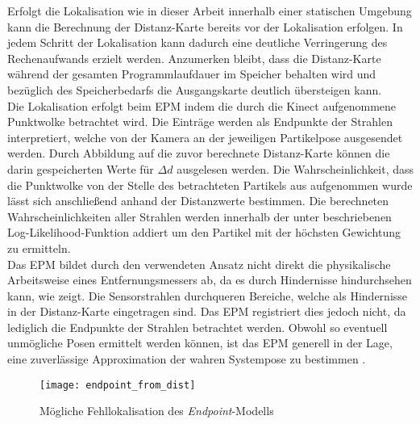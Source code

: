 Erfolgt die Lokalisation wie in dieser Arbeit innerhalb einer statischen Umgebung kann die Berechnung der Distanz-Karte bereits vor der Lokalisation erfolgen. In jedem Schritt der Lokalisation kann dadurch eine deutliche Verringerung des Rechenaufwands erzielt werden. Anzumerken bleibt, dass die Distanz-Karte während der gesamten Programmlaufdauer im Speicher behalten wird und bezüglich des Speicherbedarfs die Ausgangskarte deutlich übersteigen kann.\\

Die Lokalisation erfolgt beim EPM indem die durch die Kinect aufgenommene Punktwolke betrachtet wird. Die Einträge werden als Endpunkte der Strahlen interpretiert, welche von der Kamera an der jeweiligen Partikelpose ausgesendet werden. Durch Abbildung auf die zuvor berechnete Distanz-Karte können die darin gespeicherten Werte für $\Delta d$ ausgelesen werden. Die Wahrscheinlichkeit, dass die Punktwolke von der Stelle des betrachteten Partikels aus aufgenommen wurde lässt sich anschließend anhand der Distanzwerte bestimmen. Die berechneten Wahrscheinlichkeiten aller Strahlen werden innerhalb der unter  beschriebenen Log-Likelihood-Funktion addiert um den Partikel mit der höchsten Gewichtung zu ermitteln.\\

Das EPM bildet durch den verwendeten Ansatz nicht direkt die physikalische Arbeitsweise eines Entfernungsmessers ab, da es durch Hindernisse \glqq hindurchsehen\grqq{} kann, wie  zeigt. Die Sensorstrahlen durchqueren Bereiche, welche als Hindernisse in der Distanz-Karte eingetragen sind. Das EPM registriert dies jedoch nicht, da lediglich die Endpunkte der Strahlen betrachtet werden. Obwohl so eventuell unmögliche Posen ermittelt werden können, ist das EPM generell in der Lage, eine zuverlässige Approximation der wahren Systempose zu bestimmen \cite{Konolige1999}.\\


\begin{figure}[!ht]
	\begin{center}
		\texttt{[image: endpoint\_from\_dist]}
		\caption{Mögliche Fehllokalisation des \textit{Endpoint}-Modells}
		\label{fig.endpoint}
	\end{center}
\end{figure}

